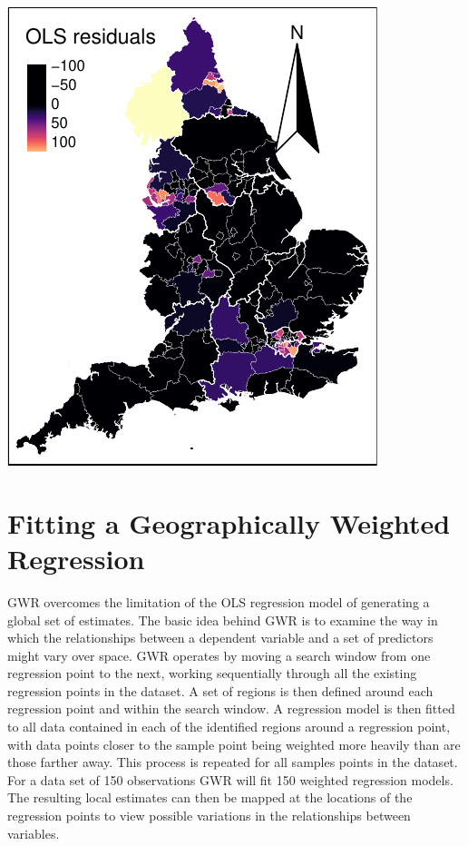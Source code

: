 \documentclass[
  letterpaper,
  DIV=11,
  numbers=noendperiod,
  oneside]{scrreprt}
\begin{document}
\includegraphics{09-gwr_files/figure-pdf/unnamed-chunk-10-1.pdf}

\section{Fitting a Geographically Weighted
Regression}\label{fitting-a-geographically-weighted-regression}

GWR overcomes the limitation of the OLS regression model of generating a
global set of estimates. The basic idea behind GWR is to examine the way
in which the relationships between a dependent variable and a set of
predictors might vary over space. GWR operates by moving a search window
from one regression point to the next, working sequentially through all
the existing regression points in the dataset. A set of regions is then
defined around each regression point and within the search window. A
regression model is then fitted to all data contained in each of the
identified regions around a regression point, with data points closer to
the sample point being weighted more heavily than are those farther
away. This process is repeated for all samples points in the dataset.
For a data set of 150 observations GWR will fit 150 weighted regression
models. The resulting local estimates can then be mapped at the
locations of the regression points to view possible variations in the
relationships between variables.
\end{document}
